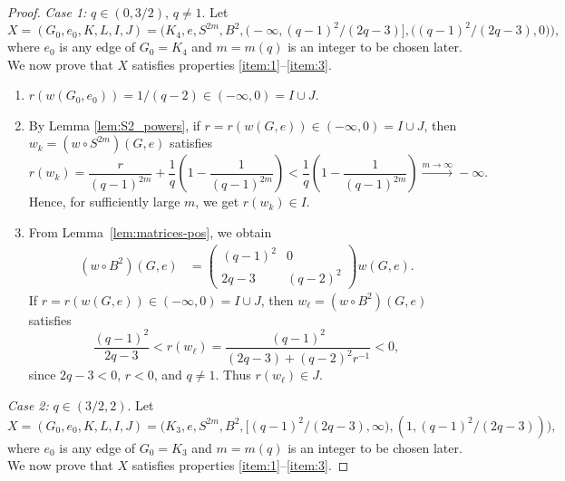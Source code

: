 \documentclass[A4paper,reqno,oneside,12pt]{amsart}
\theoremstyle{plain}
\theoremstyle{definition}
\newcommand{\of}[1]{\left( #1 \right)}
\begin{document}
\begin{proof}
\emph{Case 1:} $q\in (0,3/2)$, $q\ne 1$. Let \[X =(G_0,e_0,K,L,I,J)=
\Big(K_4,e,S^{2m},B^2, \big(- \infty, (q-1)^2 / (2q-3)\big], \big((q-1)^2 / (2q-3),0\big)\Big),\]
where $e_0$ is any edge of $G_0=K_4$ and $m=m(q)$ is an integer to be chosen later.
We now prove that $X$ satisfies properties \eqref{item:1}--\eqref{item:3}.
\begin{enumerate}
    \item $r(w(G_0,e_0)) = 1/(q-2)\in (-\infty,0)=I \cup J$.
    \item By Lemma \ref{lem:S2_powers}, if $r = r(w(G,e)) \in (-\infty,0) = I \cup J$, then $w_k = (w \circ S^{2m})(G,e)$ satisfies
    \begin{equation*}
        r(w_k) = \frac{r}{(q-1)^{2m}} + \frac{1}{q} \of{1 - \frac{1}{(q-1)^{2m}}} < \frac{1}{q} \of{1 - \frac{1}{(q-1)^{2m}}} \overset{m \to \infty}{\longrightarrow} - \infty.
    \end{equation*}
       Hence, for sufficiently large $m$, we get $r(w_k) \in I$.  
    \item From Lemma~\ref{lem:matrices-pos}, we obtain
    \begin{align}\label{eq:B2_matrix}
        (w \circ B^2)(G,e) &= \begin{pmatrix}
            (q-1)^2 & 0 \\
            2q-3 & (q-2)^2 
        \end{pmatrix}
        w(G,e).
    \end{align}
    If $r = r(w(G,e)) \in (-\infty,0) = I \cup J$, then $w_\ell = (w \circ B^2)(G,e)$ satisfies 
    \begin{equation*}
        \frac{(q-1)^2}{2q-3}< r(w_\ell) = \frac{(q-1)^2}{(2q-3) + (q-2)^2 r^{-1}} < 0,
    \end{equation*}
    since $2q - 3 < 0$, $r<0$, and $q \neq 1$. Thus $r(w_\ell) \in J$.
\end{enumerate}
    

\emph{Case 2:} $q \in (3/2, 2)$. Let \[X =(G_0,e_0,K,L,I,J)=
\Big(K_3,e,S^{2m},B^2,  \big[(q-1)^2 / (2q-3),\infty\big), (1,(q-1)^2 / (2q-3))\Big),\]
where $e_0$ is any edge of $G_0=K_3$ and $m=m(q)$ is an integer to be chosen later.
We now prove that $X$ satisfies properties \eqref{item:1}--\eqref{item:3}.


\end{proof}
\end{document}
